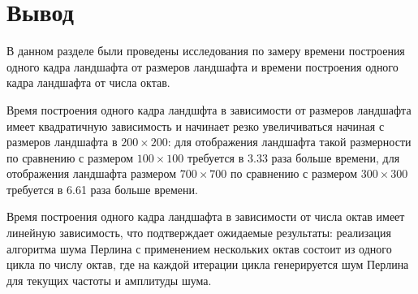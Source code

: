 \section{Вывод}

В данном разделе были проведены исследования по замеру времени построения одного кадра ландшафта от размеров ландшафта и времени построения одного кадра  ландшафта от числа октав.

Время построения одного кадра ландшфта в зависимости от размеров ландшафта имеет квадратичную зависимость и начинает резко увеличиваться начиная с размеров ландшафта в $200\times200$: для отображения ландшафта такой размерности по сравнению с размером  $100\times100$ требуется в 3.33 раза больше времени, для отображения ландшафта размером $700\times700$ по сравнению с размером  $300\times300$ требуется в 6.61 раза больше времени.

Время построения одного кадра ландшафта в зависимости от числа октав имеет линейную зависимость, что подтверждает ожидаемые результаты: реализация алгоритма шума Перлина с применением нескольких октав состоит из одного цикла по числу октав, где на каждой итерации цикла генерируется шум Перлина для текущих частоты и амплитуды шума.



